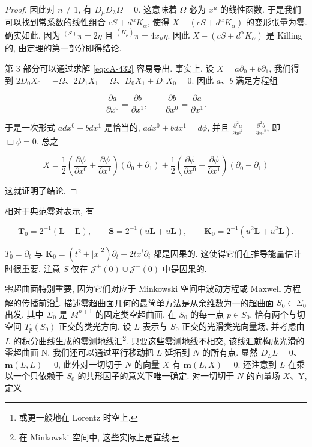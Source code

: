 \begin{proof}
因此对 $n \neq 1$, 有 $D_{\mu}D_{\lambda}\Omega = 0$. 这意味着 $\Omega$ 必为 $x^{\mu}$ 的线性函数. 于是我们可以找到常系数的线性组合 $cS + d^{\alpha}K_{\alpha}$, 使得 $X - (cS + d^{\alpha}K_{\alpha})$ 的变形张量为零. 确实如此, 因为 $^{(S)}\pi = 2\eta$ 且 $^{(K_{\mu})}\pi = 4x_{\mu}\eta$. 因此 $X - (cS + d^{\alpha}K_{\alpha})$ 是 Killing 的, 由定理的第一部分即得结论.

第 3 部分可以通过求解 \eqref{eq:cA-432} 容易导出. 事实上, 设 $X = a\partial_0 + b\partial_1$, 我们得到 $2D_0X_0 = -\Omega$、$2D_1X_1 = \Omega$、$D_0X_1 + D_1X_0 = 0$. 因此 $a$、$b$ 满足方程组

\[
\frac{\partial a}{\partial x^{0}} = \frac{\partial b}{\partial x^{1}}, \qquad \frac{\partial b}{\partial x^{0}} = \frac{\partial a}{\partial x^{1}}.
\]

于是一次形式 $adx^0 + bdx^1$ 是恰当的, $adx^0 + bdx^1 = d\phi$, 并且 $\frac{\partial^2a}{\partial x^{0^2}} = \frac{\partial^2b}{\partial x^{1^2}}$, 即 $\Box\phi = 0$. 总之

\[
X = \frac{1}{2}\left(\frac{\partial\phi}{\partial x^{0}} + \frac{\partial\phi}{\partial x^{1}}\right)(\partial_{0} + \partial_{1}) + \frac{1}{2}\left(\frac{\partial\phi}{\partial x^{0}} - \frac{\partial\phi}{\partial x^{1}}\right)(\partial_{0} - \partial_{1})
\]

这就证明了结论.
\end{proof}


\begin{remark*}
相对于典范零对表示, 有

\begin{equation}
\mathbf{T}_{0} = 2^{-1}(\mathbf{L} + \underline{\mathbf{L}}), \qquad \mathbf{S} = 2^{-1}(\underline{u}\mathbf{L} + u\underline{\mathbf{L}}), \qquad \mathbf{K}_{0} = 2^{-1}(\underline{u}^{2}\mathbf{L} + u^{2}\underline{\mathbf{L}}).\label{eq:cA-437}
\end{equation}

$T_{0} = \partial_{t}$ 与 $\mathbf{K}_{0} = (t^{2} + |x|^{2})\partial_{t} + 2tx^{i}\partial_{i}$ 都是因果的. 这使得它们在推导能量估计时很重要. 注意 $S$ 仅在 $\mathcal{J}^{+}(0) \cup \mathcal{J}^{-}(0)$ 中是因果的.
\end{remark*}


零超曲面特别重要, 因为它们对应于 Minkowski 空间中波动方程或 Maxwell 方程解的传播前沿\footnote{或更一般地在 Lorentz 时空上.}. 描述零超曲面几何的最简单方法是从余维数为一的超曲面 $S_{0} \subset \Sigma_{0}$ 出发, 其中 $\Sigma_{0}$ 是 $M^{n+1}$ 的固定类空超曲面. 在 $S_{0}$ 的每一点 $p \in S_{0}$, 恰有两个与切空间 $T_{p}(S_{0})$ 正交的类光方向. 设 $L$ 表示与 $S_{0}$ 正交的光滑类光向量场, 并考虑由 $L$ 的积分曲线生成的零测地线汇\footnote{在 Minkowski 空间中, 这些实际上是直线.}. 只要这些零测地线不相交, 该线汇就构成光滑的零超曲面 N. 我们还可以通过平行移动把 $L$ 延拓到 $N$ 的所有点. 显然 $D_{L}L = 0$、$\mathbf{m}(L, L) = 0$, 此外对一切切于 $N$ 的向量 $X$ 有 $\mathbf{m}(L, X) = 0$. 还注意到 $L$ 在乘以一个只依赖于 $S_{0}$ 的共形因子的意义下唯一确定. 对一切切于 $N$ 的向量场 $X$、Y, 定义


